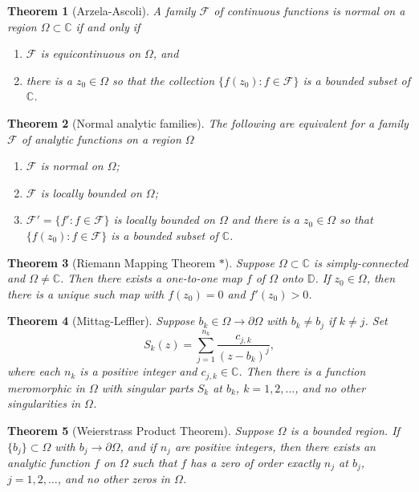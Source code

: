 \documentclass[12pt]{article}
\newtheorem{sats}{Theorem}
\theoremstyle{definition}
\newcommand{\D}{\mathbb{D}}      %
\newcommand{\C}{\mathbb{C}}    %
\begin{document}
\begin{sats}[Arzela-Ascoli]
    A family $\mathcal{F}$ of continuous functions is normal on a region $\Omega\subset\C$ if and only if
    \begin{enumerate}[label=(\roman*)]
        \item $\mathcal{F}$ is equicontinuous on $\Omega$, and
        \item there is a $z_0\in \Omega$ so that the collection $\{f(z_0):f\in\mathcal{F}\}$ is a bounded subset of $\C$.
    \end{enumerate}
\end{sats}

\begin{sats}[Normal analytic families]
    The following are equivalent for a family $\mathcal{F}$ of analytic functions on a region $\Omega$
    \begin{enumerate}[label=(\roman*)]
        \item $\mathcal{F}$ is normal on $\Omega$;
        \item $\mathcal{F}$ is locally bounded on $\Omega$;
        \item $\mathcal{F}'=\{f':f\in\mathcal{F}\}$ is locally bounded on $\Omega$ and there is a $z_0\in\Omega$ so that $\{f(z_0):f\in\mathcal{F}\}$ is a bounded subset of $\C$. 
    \end{enumerate}
\end{sats}

\begin{sats}[Riemann Mapping Theorem $*$]
    Suppose $\Omega\subset\C$ is simply-connected and $\Omega\neq\C$. Then there exists a one-to-one map $f$ of $\Omega$ onto $\D$. If $z_0\in\Omega$, then there is a unique such map with $f(z_0)=0$ and $f'(z_0)>0$.
\end{sats}

\begin{sats}[Mittag-Leffler]
    Suppose $b_k\in\Omega\to\partial\Omega$ with $b_k\neq b_j$ if $k\neq j$. Set 
    \begin{equation*}
        S_k(z)=\sum_{j=1}^{n_k}\frac{c_{j,k}}{(z-b_k)^j},
    \end{equation*}
    where each $n_k$ is a positive integer and $c_{j,k}\in\C$. Then there is a function meromorphic in $\Omega$ with singular parts $S_k$ at $b_k$, $k=1,2,\dots$, and no other singularities in $\Omega$. 
\end{sats}

\begin{sats}[Weierstrass Product Theorem]
    Suppose $\Omega$ is a bounded region. If $\{b_j\}\subset\Omega$ with $b_j\to\partial\Omega$, and if $n_j$ are positive integers, then there exists an analytic function $f$ on $\Omega$ such that $f$ has a zero of order exactly $n_j$ at $b_j$, $j=1,2,\dots$, and no other zeros in $\Omega$.
\end{sats}
\end{document}
